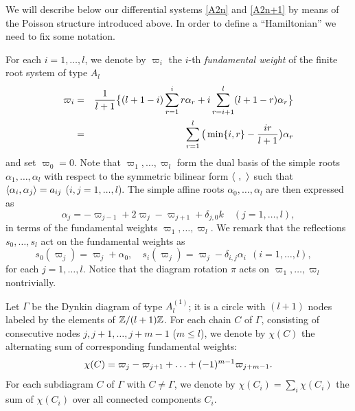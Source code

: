\medskip
We will describe below our differential systems \eqref{A2n} and \eqref{A2n+1}
by means of the Poisson structure introduced above. 
In order to define a ``Hamiltonian'' we need to fix some notation. 

\medskip
For each $i=1,\ldots,l$, we denote by $\varpi_i$  
the $i$-th {\em fundamental weight\/} of the 
finite root system of type $A_l$ 
\begin{eqnarray}\Label{def-fwt}
\varpi_i&=&\frac{1}{l+1}\big\{
(l+1-i)\sum_{r=1}^i r\alpha_r + i\sum_{r=i+1}^{l}(l+1-r)\alpha_r\big\}\\
&=&\sum_{r=1}^l\big(\min\{i,r\}-\frac{ir}{l+1}\big)\alpha_r \notag
\end{eqnarray} 
and set $\varpi_0=0$.  
Note that $\varpi_1,\ldots,\varpi_l$ form the dual basis of the simple roots 
$\alpha_1,\ldots,\alpha_l$ with respect to the symmetric bilinear form 
$\langle \ ,\  \rangle$ such that $\langle \alpha_i,\alpha_j \rangle=a_{ij}$ ($i,j=1,\ldots,l$). 
The simple affine roots $\alpha_0,\ldots,\alpha_l$ 
are then expressed  as 
\begin{equation}
\alpha_j=-\varpi_{j-1}+2 \varpi_j -\varpi_{j+1}+\delta_{j,0} k \quad(j=1,\ldots,l), 
\end{equation} 
in terms of the fundamental weights $\varpi_1,\ldots,\varpi_l$.  
We remark that the reflections $s_0,\ldots,s_l$ act on the fundamental weights 
as 
\begin{equation}
s_0(\varpi_j)=\varpi_j+\alpha_0,\quad
s_i(\varpi_j)=\varpi_j-\delta_{i,j} \alpha_i \ \ (i=1,\ldots,l),
\quad 
\end{equation}
for each $j=1,\ldots,l$. 
Notice that the diagram rotation $\pi$ acts on $\varpi_1,\ldots,\varpi_l$ 
nontrivially. 

Let $\Gamma$ be the Dynkin diagram of type $A^{(1)}_l$; it is a circle with 
$(l+1)$ nodes labeled by the elements of ${\Bbb Z}/(l+1){\Bbb Z}$. 
For each chain $C$ of $\Gamma$, consisting of
consecutive nodes $j,j+1,\ldots,j+m-1$ ($m\le l$), we denote by 
$\chi(C)$ the alternating sum of corresponding fundamental weights: 
\begin{equation}\Label{chi}
\chi(C)=\varpi_j-\varpi_{j+1}+\ldots+(-1)^{m-1}\varpi_{j+m-1}. 
\end{equation} 
For each subdiagram $C$ of $\Gamma$ with $C\ne \Gamma$, 
we denote by $\chi(C_i)=\sum_i \chi(C_i)$ the sum of $\chi(C_i)$ over all 
connected components $C_i$. 

